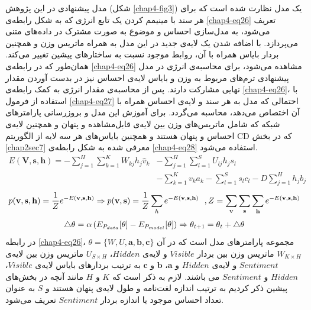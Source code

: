 مدل پیشنهادی در این پژوهش 
(شکل \ref{chap4-fig3})
 یک مدل نظارت شده است که برای هر سند با مینیمم کردن یک تابع انرژی که به شکل رابطه‌‌ی
\ref{chap4-eq26}
تعریف می‌‌شود، به مدل‌سازی احساس و موضوع به صورت مشترک در داده‌های متنی می‌‌پردازد. با اضافه شدن یک لایه‌ی جدید در این مدل به همراه ماتریس وزن و همچنین بردار بایاس همراه با آن، روابط موجود نسبت به ساختار‌های پیشین تغییر می‌کند. همان‌طور که در رابطه‌ی
\ref{chap4-eq26}
مشاهده می‌‌شود، برای محاسبه‌ی انرژی در مدل پیشنهادی ترم‌های مربوط به وزن و بایاس لایه‌ی احساس نیز در بدست آوردن مقدار نهایی مشارکت دارند. پس از محاسبه‌ی مقدار انرژی به کمک رابطه‌ی
\ref{chap4-eq26}،
 با استفاده از فرمول
\ref{chap4-eq27}
احتمالی‌ که مدل به هر سند و ‌لایه‌ی احساس همراه با آن اختصاص می‌‌دهد، محاسبه می‌‌گردد. برای آموزش این مدل و بروزرسانی پارامترهای شبکه که شامل ماتریس‌های وزن بین لایه‌ی قابل‌مشاهده و پنهان و همچنین لایه‌ی احساس و پنهان هستند و همچنین بایاس‌های هر سه‌ لایه از الگوریتم
CD
که در بخش
\ref{chap2sec7}
معرفی‌ شده به شکل رابطه‌ی
\ref{chap4-eq28}
استفاده می‌‌شود.
\begin{align}
	\label{chap4-eq26}
	E(\textbf{V},\textbf{s},\textbf{h})=-\sum_{j=1}^{H}\sum_{k=1}^{K}W_{kj}h_j\hat{v}_{k}&-\sum_{j=1}^{H}\sum_{l=1}^{S}U_{lj}h_js_l\\\nonumber
	&-\sum_{k=1}^{K}v_{k}a_{k} -\sum_{l=1}^{S}s_lc_l- D\sum_{j=1}^{H}h_jb_j
\end{align}
\begin{align}
	\centering
	\label{chap4-eq27}
	p(\textbf{v},\textbf{s},\textbf{h}) = \dfrac{1}{Z} e^{-E(\textbf{v},\textbf{s},\textbf{h})} \Rightarrow
	p(\textbf{v},\textbf{s}) = \dfrac{1}{Z} \sum_{h}  e^{-E(\textbf{v},\textbf{s},\textbf{h})} \ \ ,
	Z = \sum_{\textbf{v}}\sum_{\textbf{s}}\sum_{\textbf{h}} e^{-E(\textbf{v},\textbf{s},\textbf{h})} 
\end{align}
\begin{align}
	\centering
	\label{chap4-eq28}
	\triangle\theta = \alpha \left( E_{P_{data}}[\theta]-E_{P_{model}}[\theta]\right) \Rightarrow \theta_{t+1} = \theta_t + \triangle\theta
\end{align}
در رابطه
\ref{chap4-eq26}، $\theta=\{W, U, \textbf{a}, \textbf{b}, \textbf{c} \}$
مجموعه پارامتر‌های مدل است که در آن
$W_{K \times H}$
ماتریس وزن بین بردار
$Visible$
و لایه‌ی
$Hidden$، $U_{S \times H}$
ماتریس وزن بین لایه‌ی
$Sentiment$
و لایه‌ی
$Hidden$
و
$\textbf{a}$، $\textbf{b}$
و
$\textbf{c}$
به ترتیب بردار‌های بایاس لایه‌ی
$Visible$، $Hidden$
و
$Sentiment$
می‌ باشند. لازم به ذکر است که
$K$
و
$H$
مانند آنچه در بخش‌های پیشین ذکر کردیم به ترتیب اندازه لغت‌نامه و طول لایه‌ی پنهان هستند و
$S$
به عنوان تعداد احساس موجود یا اندازه بردار
$Sentiment$
تعریف می‌‌شود.

